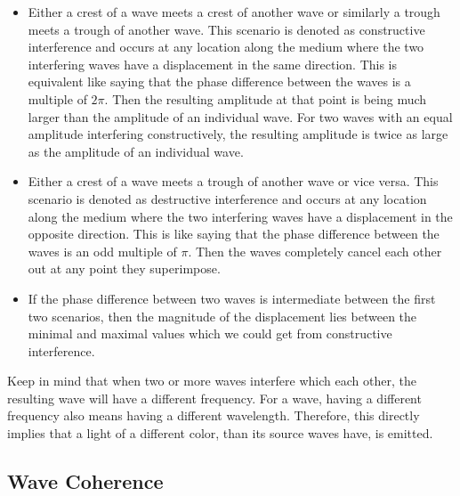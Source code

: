 \begin{itemize}
  \item Either a crest of a wave meets a crest of another wave or similarly a trough meets a trough of another wave. This scenario is denoted as constructive interference and occurs at any location along the medium where the two interfering waves have a displacement in the same direction. This is equivalent like saying that the phase difference between the waves is a multiple of $2\pi$. Then the resulting amplitude at that point is being much larger than the amplitude of an individual wave. For two waves with an equal amplitude interfering constructively, the resulting amplitude is twice as large as the amplitude of an individual wave.
  \item Either a crest of a wave meets a trough of another wave or vice versa. This scenario is denoted as destructive interference and occurs at any location along the medium where the two interfering waves have a displacement in the opposite direction. This is like saying that the phase difference between the waves is an odd multiple of $\pi$. Then the waves completely cancel each other out at any point they superimpose.
  \item If the phase difference between two waves is intermediate between the first two scenarios, then the magnitude of the displacement lies between the minimal and maximal values which we could get from constructive interference.
\end{itemize}
Keep in mind that when two or more waves interfere which each other, the resulting wave will have a different frequency. For a wave, having a different frequency also means having a different wavelength. Therefore, this directly implies that a light of a different color, than its source waves have, is emitted. 

\subsection{Wave Coherence}
